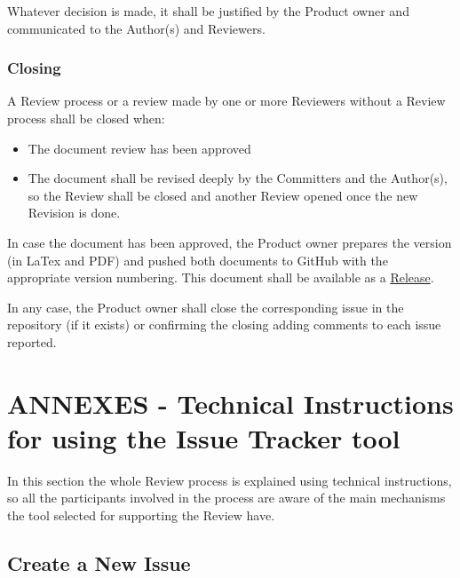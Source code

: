 \documentclass{template/openetcs_article}
\begin{document}
Whatever decision is made, it shall be justified by the Product owner and communicated to the Author(s) and Reviewers.

\subsubsection{Closing}

A Review process or a review made by one or more Reviewers without a Review process shall be closed when:

\begin{itemize}
\item The document review has been approved
\item The document shall be revised deeply by the Committers and the Author(s), so the Review shall be closed and another Review opened once the new Revision is done.
\end{itemize} 

In case the document has been approved, the Product owner prepares the version (in LaTex and PDF) and pushed both documents to GitHub with the appropriate version numbering. This document shall be available as a \underline{Release}.

In any case, the Product owner shall close the corresponding issue in the repository (if it exists) or confirming the closing adding comments to each issue reported. 

\section{ANNEXES - Technical Instructions for using the Issue Tracker tool}

In this section the whole Review process is explained using technical instructions, so all the participants involved in the process are aware of the main mechanisms the tool selected for supporting the Review have. 

\subsection{Create a New Issue}
\end{document}
